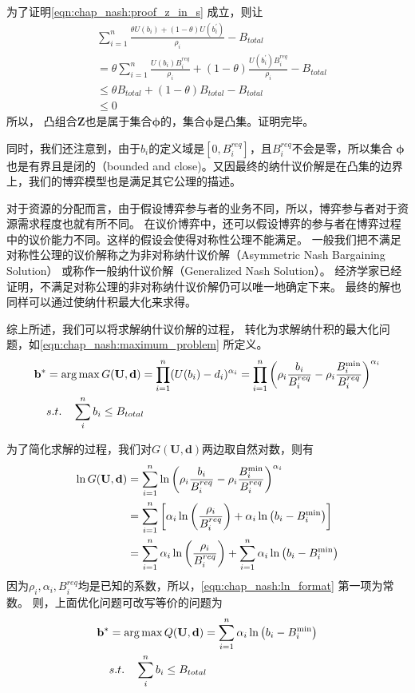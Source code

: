 为了证明\eqref{eqn:chap_nash:proof_z_in_s} 成立，则让
\begin{align*}
    &\sum_{i=1}^{n} \frac{ \theta U(b_i) + (1-\theta) U(b_i^\prime)}{\rho_i} - B_{total} \\
    &= \theta \sum_{i=1}^n \frac{U(b_i)B_i^{req}}{\rho_i} + (1-\theta) \frac{U(b_i^\prime)B_i^{req}}{\rho_i} -B_{total} \\
    &\le \theta B_{total} + (1-\theta)B_{total} - B_{total}\\
    & \le 0
\end{align*}
所以，
凸组合$\mathbf{Z}$也是属于集合$\mathbf{\phi}$的，集合$\mathbf{\phi}$是凸集。证明完毕。

同时，我们还注意到，由于$b_i$的定义域是$[0,B_i^{req}]$，且$B_i^{req}$不会是零，所以集合
$\mathbf{\phi}$也是有界且是闭的（bounded and close)。又因最终的纳什议价解是在凸集的边界上，我们的博弈模型也是满足其它公理的描述。

对于资源的分配而言，由于假设博弈参与者的业务不同，所以，博弈参与者对于资源需求程度也就有所不同。
在议价博弈中，还可以假设博弈的参与者在博弈过程中的议价能力不同。这样的假设会使得对称性公理不能满足。
一般我们把不满足对称性公理的议价解称之为非对称纳什议价解（Asymmetric Nash Bargaining Solution）
或称作一般纳什议价解（Generalized  Nash  Solution）。
经济学家已经证明，不满足对称公理的非对称纳什议价解仍可以唯一地确定下来\cite{Osborne_Rubinstein_1994}。
最终的解也同样可以通过使纳什积最大化来求得。

综上所述，我们可以将求解纳什议价解的过程，
转化为求解纳什积的最大化问题，如\eqref{eqn:chap_nash:maximum_problem} 所定义。
\begin{align}
    \mathbf{b}^* &= \arg \max G(\mathbf{U}, \mathbf{d}) = \prod_{i=1}^n (U(b_i) - d_i)^{\alpha_i} = \prod_{i=1}^{n} \left(\rho_i \frac{b_i}{B_i^{req}} - \rho_i \frac{B_i^{\min}}{B_i^{req}} \right)^{\alpha_i} \notag\\
    & s.t. \quad \sum_i^n b_i \le B_{total} 
    \label{eqn:chap_nash:maximum_problem}
\end{align}


为了简化求解的过程，我们对$G(\mathbf{U}, \mathbf{d})$两边取自然对数，则有
\begin{align}
    \ln G(\mathbf{U}, \mathbf{d}) &= \sum_{i=1}^{n} \ln \left(\rho_i \frac{b_i}{B_i^{req}} - \rho_i \frac{B_i^{\min}}{B_i^{req}} \right)^{\alpha_i} \notag \notag\\
    &= \sum_{i=1}^n \left[ \alpha_i \ln \left( \frac{\rho_i}{B_i^{req}} \right) + \alpha_i \ln \left( b_i - B_i^{\min} \right) \right] \notag\\
    &= \sum_{i=1}^n \alpha_i \ln \left( \frac{\rho_i}{B_i^{req}} \right) + \sum_{i=1}^n  \alpha_i \ln \left(b_i - B_i^{\min} \right) 
    \label{eqn:chap_nash:ln_format}
\end{align}
因为$\rho_i, \alpha_i, B_i^{req}$均是已知的系数，所以，\eqref{eqn:chap_nash:ln_format} 第一项为常数。
则，上面优化问题可改写等价的问题为
\begin{align}
    \mathbf{b}^* &= \arg \max Q(\mathbf{U}, \mathbf{d}) = \sum_{i=1}^n  \alpha_i \ln \left( b_i - B_i^{\min} \right) \notag\\
    & s.t. \quad \sum_i^n b_i \le B_{total} 
\end{align}

